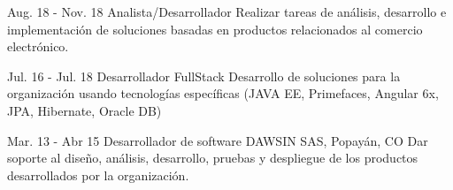 \documentclass[]{cv-class}
\begin{document}
\begin{entrylist}
	\entry
	{Aug. 18 - Nov. 18}
	{Analista/Desarrollador}
	{\href{http://www.serviciosenweb.com/}{ }}
	{Realizar tareas de análisis, desarrollo e implementación de soluciones basadas en productos relacionados al comercio electrónico.}
	
	\entry
	{Jul. 16 - Jul. 18}
	{Desarrollador FullStack}
	{\href{https://sitis.com.co/}{ }}
	{Desarrollo de soluciones para la organización usando tecnologías específicas (JAVA EE, Primefaces, Angular 6x, JPA, Hibernate, Oracle DB)}
	
	\entry
	{Mar. 13 - Abr 15}
	{Desarrollador de software}
	{DAWSIN SAS, Popayán, CO}
	{Dar soporte al diseño, análisis, desarrollo, pruebas y despliegue de los productos desarrollados por la organización.}
\end{entrylist}
\end{document}
